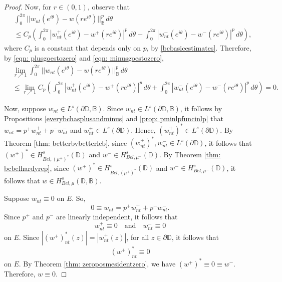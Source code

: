 \documentclass[12pt,reqno]{amsart}
\theoremstyle{definition}
\theoremstyle{remark}
\newcommand{\p}{\partial}
\newcommand{\bc}{\mathbb{B}}
\newcommand{\disk}{\mathbb{D}}
\begin{document}
\begin{proof}
        Now, for $r \in (0,1)$, observe that
        \begin{align*}
            & \int_0^{2\pi} ||w_{nt}(e^{i\theta}) - w(re^{i\theta}) ||^p_{\bc} \, d\theta\\
            &\leq C_p \left( \int_0^{2\pi} |w^+_{nt}(e^{i\theta}) - w^+(re^{i\theta})|^p \,d\theta +  \int_0^{2\pi} |w^-_{nt}(e^{i\theta}) - w^-(re^{i\theta})|^p \,d\theta \right),
        \end{align*}
        where $C_p$ is a constant that depends only on $p$, by \eqref{bcbasicestimates}. Therefore, by \eqref{eqn: plusgoestozero} and \eqref{eqn: minusgoestozero}, 
        \begin{align*}
            &\lim_{r\nearrow 1} \int_0^{2\pi} ||w_{nt}(e^{i\theta}) - w(re^{i\theta}) ||^p_{\bc} \, d\theta \\
            &\leq \lim_{r \nearrow 1} C_p \left( \int_0^{2\pi} |w^+_{nt}(e^{i\theta}) - w^+(re^{i\theta})|^p \,d\theta +  \int_0^{2\pi} |w^-_{nt}(e^{i\theta}) - w^-(re^{i\theta})|^p \,d\theta \right)= 0.
        \end{align*}

        Now, suppose $w_{nt} \in L^s(\p\disk,\bc)$. Since $w_{nt} \in L^s(\p\disk,\bc)$, it follows by Propositions \ref{everybchasplusandminus} and  \ref{prop: pminlpfuncinlp} that $w_{nt} = p^+w^+_{nt} + p^-w^-_{nt}$ and $w^\pm_{nt} \in L^s(\p \disk)$.  Hence, $(w^+_{nt})^* \in L^s(\p\disk)$. By Theorem \ref{thm: betterbvbetterleb}, since $(w^+_{nt})^*, w^-_{nt} \in L^s(\p \disk)$, it follows that $(w^+)^* \in H^s_{Bel,(\mu^+)^*}(\disk)$ and $w^- \in H^s_{Bel,\mu^-}(\disk)$. By Theorem \ref{thm: bcbelhardyrep}, since $(w^+)^* \in H^s_{Bel,(\mu^+)^*}(\disk)$ and $w^- \in H^s_{Bel,\mu^-}(\disk)$, it follows that $w \in H^s_{Bel,\mu}(\disk,\bc)$.

        Suppose $w_{nt} \equiv 0$ on $E$. So,
\[
   0 \equiv  w_{nt} = p^+ w^+_{nt} + p^- w^-_{nt} .
\]
Since $p^+$ and $p^-$ are linearly independent, it follows that 
\[
        w^+_{nt} \equiv 0 \quad\text{and}\quad w^-_{nt} \equiv 0
\]
on $E$. Since $|(w^+)_{nt}^*(z)| = |w^+_{nt}(z)|$, for all $z \in \p \disk$, it follows that 
\[
        (w^+)^*_{nt} \equiv 0
\]
on $E$. By Theorem \ref{thm: zeroposmesidentzero}, we have $(w^+)^* \equiv 0 \equiv w^-$. Therefore, $w \equiv 0$. 

    \end{proof}
\end{document}
